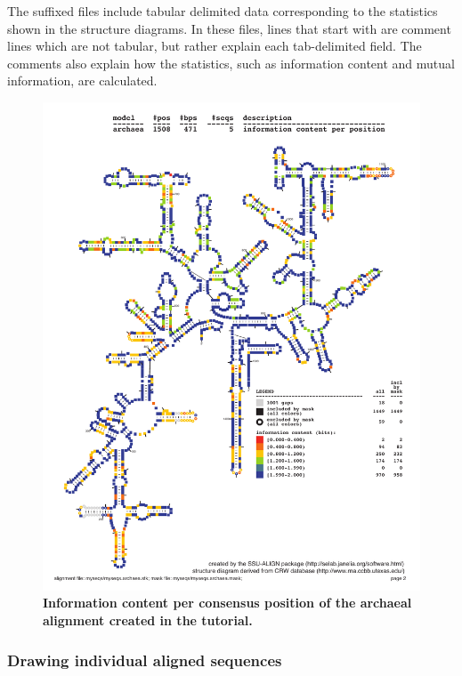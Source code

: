 The  suffixed files include tabular delimited data
corresponding to the statistics shown in the structure diagrams. In
these files, lines that start with \prog{\#} are comment lines
which are not tabular, but rather explain each tab-delimited field. The
comments also explain how the statistics, such as information content
and mutual information, are calculated.

\begin{figure}
  \begin{center}
\includegraphics[width=6.5in]{Figures/myseqs-archaea-info}
\textbf{Information content per consensus position of the
          archaeal alignment created in the tutorial.}
  \end{center}
\label{fig:myseqs-archaea-info}
\end{figure}

\subsubsection{Drawing individual aligned sequences}

